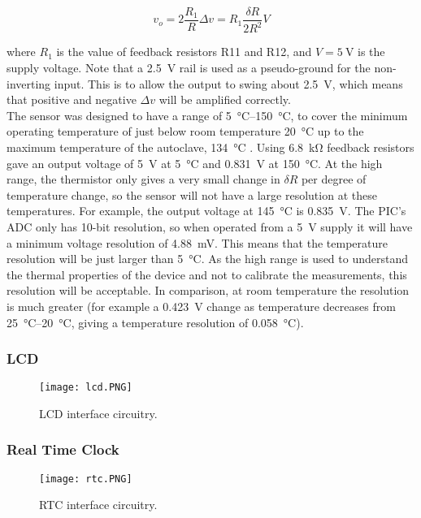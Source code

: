 \begin{equation}
v_o = 2 \frac{R_1}{R} \Delta v =R_1 \frac{\delta R}{2 R^2}V
\end{equation}

where $R_1$ is the value of feedback resistors R11 and R12, and $V=\SI{5}{\volt}$ is the supply voltage. Note that a \SI{2.5}{\volt} rail is used as a pseudo-ground for the non-inverting input. This is to allow the output to swing about \SI{2.5}{\volt}, which means that positive and negative $\Delta v$ will be amplified correctly.\\

The sensor was designed to have a range of \SIrange{5}{150}{\celsius}, to cover the minimum operating temperature of just below room temperature \SI{20}{\celsius} up to the maximum temperature of the autoclave, \SI{134}{\celsius} \cite{nhs_autoclave}. Using \SI{6.8}{\kilo\ohm} feedback resistors gave an output voltage of \SI{5}{\volt} at \SI{5}{\celsius} and \SI{0.831}{\volt} at \SI{150}{\celsius}. At the high range, the thermistor only gives a very small change in $\delta R$ per degree of temperature change, so the sensor will not have a large resolution at these temperatures. For example, the output voltage at \SI{145}{\celsius} is \SI{0.835}{\volt}. The PIC's ADC only has 10-bit resolution, so when operated from a \SI{5}{\volt} supply it will have a minimum voltage resolution of \SI{4.88}{\milli\volt}. This means that the temperature resolution will be just larger than \SI{5}{\celsius}. As the high range is used to understand the thermal properties of the device and not to calibrate the measurements, this resolution will be acceptable. In comparison, at room temperature the resolution is much greater (for example a \SI{0.423}{\volt} change as temperature decreases from \SIrange{25}{20}{\celsius}, giving a temperature resolution of \SI{0.058}{\celsius}).\\



\subsubsection{LCD}
\begin{figure}[htbp]
	\texttt{[image: lcd.PNG]}
	\caption{LCD interface circuitry.}
	\label{fig: lcd schematic}
\end{figure}



\subsubsection{Real Time Clock}
\begin{figure}[htbp]
	\texttt{[image: rtc.PNG]}
	\caption{RTC interface circuitry.}
	\label{fig: rtc schematic}
\end{figure}


